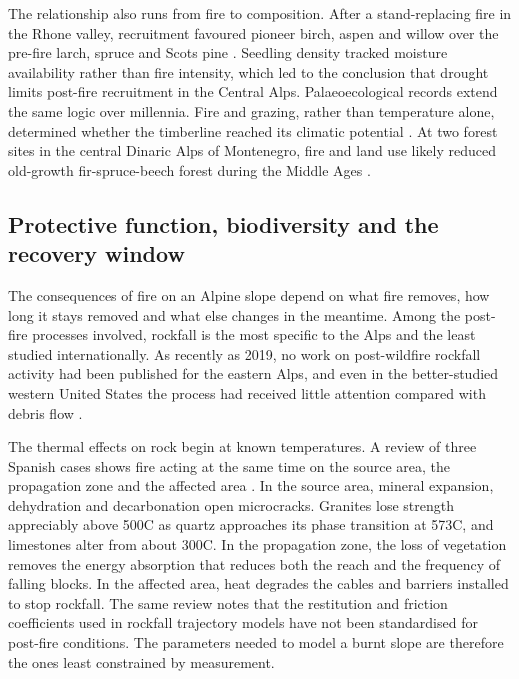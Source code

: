 \documentclass[11pt,a4paper]{article}
\begin{document}
The relationship also runs from fire to composition. After a stand-replacing fire in the Rhone valley, recruitment favoured pioneer birch, aspen and willow over the pre-fire larch, spruce and Scots pine \citep{moser_potential_2010}. Seedling density tracked moisture availability rather than fire intensity, which led to the conclusion that drought limits post-fire recruitment in the Central Alps. Palaeoecological records extend the same logic over millennia. Fire and grazing, rather than temperature alone, determined whether the timberline reached its climatic potential \citep{colombaroli_species_2010}. At two forest sites in the central Dinaric Alps of Montenegro, fire and land use likely reduced old-growth fir-spruce-beech forest during the Middle Ages \citep{cagliero_effect_2022}.

\subsection{Protective function, biodiversity and the recovery window}

The consequences of fire on an Alpine slope depend on what fire removes, how long it stays removed and what else changes in the meantime. Among the post-fire processes involved, rockfall is the most specific to the Alps and the least studied internationally. As recently as 2019, no work on post-wildfire rockfall activity had been published for the eastern Alps, and even in the better-studied western United States the process had received little attention compared with debris flow \citep{melzner_brief_2019}.

The thermal effects on rock begin at known temperatures. A review of three Spanish cases shows fire acting at the same time on the source area, the propagation zone and the affected area \citep{sarro_effects_2021}. In the source area, mineral expansion, dehydration and decarbonation open microcracks. Granites lose strength appreciably above 500\degree{}C as quartz approaches its phase transition at 573\degree{}C, and limestones alter from about 300\degree{}C. In the propagation zone, the loss of vegetation removes the energy absorption that reduces both the reach and the frequency of falling blocks. In the affected area, heat degrades the cables and barriers installed to stop rockfall. The same review notes that the restitution and friction coefficients used in rockfall trajectory models have not been standardised for post-fire conditions. The parameters needed to model a burnt slope are therefore the ones least constrained by measurement.
\end{document}
